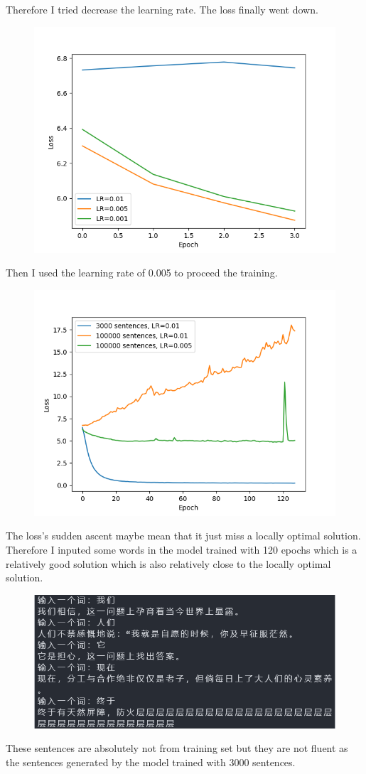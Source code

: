 \documentclass[UTF8, a4paper, 11pt]{article}
\begin{document}
Therefore I tried decrease the learning rate. The loss finally went down.
\begin{figure}[H]
      \centering
      \includegraphics[width = 0.8 \textwidth]{low_lr.png}
\end{figure}
Then I used the learning rate of 0.005 to proceed the training.
\begin{figure}[H]
      \centering
      \includegraphics[width = 0.8 \textwidth]{loss100000.png}
\end{figure}
The loss's sudden ascent maybe mean that it just miss a locally optimal solution. Therefore I inputed some words in the model trained with 120 epochs which is a
relatively good solution which is also relatively close to the locally optimal solution.
\begin{figure}[H]
      \centering
      \includegraphics[width = 0.8 \textwidth]{test100000.png}
\end{figure}
These sentences are absolutely not from training set but they are not fluent as the sentences generated by the model trained with 3000 sentences.
\end{document}
